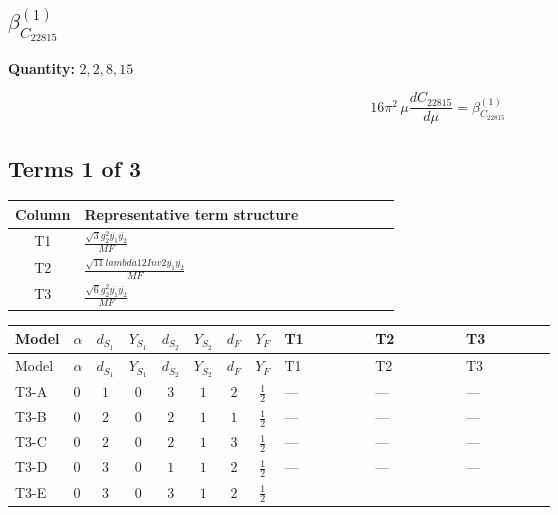 \documentclass[8pt]{article}
\begin{document}
\begin{landscape}
\section*{$\beta_{C_{22815}}^{(1)}$}
\noindent\textbf{Quantity: }$\mathrm{2,2,8,15}$\par\smallskip
\[16\pi^2\,\mu\frac{d C_{22815}}{d\mu}=\beta_{C_{22815}}^{(1)}\]
\subsection*{Terms 1 of 3}
\begin{center}
\begin{tabular}{@{}c >{\raggedright\arraybackslash}p{0.82\linewidth}@{}}
\toprule
Column & Representative term structure \\
\midrule
T1 & \(\displaystyle \frac{\sqrt{3} g_{2}^{2} \overline{y_{1}} \overline{y_{2}}}{MF}\) \\
\midrule
T2 & \(\displaystyle \frac{\sqrt{11} lambda12Inv2 \overline{y_{1}} \overline{y_{2}}}{MF}\) \\
\midrule
T3 & \(\displaystyle \frac{\sqrt{6} g_{2}^{2} \overline{y_{1}} \overline{y_{2}}}{MF}\) \\
\midrule
\bottomrule
\end{tabular}
\end{center}
\smallskip
\tiny
\begin{longtable}{@{}llcccccc >{\raggedright\arraybackslash}p{0.21\linewidth} >{\raggedright\arraybackslash}p{0.21\linewidth} >{\raggedright\arraybackslash}p{0.21\linewidth}@{}}
\toprule
Model & $\alpha$ & $d_{S_1}$ & $Y_{S_1}$ & $d_{S_2}$ & $Y_{S_2}$ & $d_F$ & $Y_F$ & T1 & T2 & T3 \\
\midrule
\endfirsthead
\toprule
Model & $\alpha$ & $d_{S_1}$ & $Y_{S_1}$ & $d_{S_2}$ & $Y_{S_2}$ & $d_F$ & $Y_F$ & T1 & T2 & T3 \\
\midrule
\endhead
T3-A & $0$ & $1$ & $0$ & $3$ & $1$ & $2$ & $\frac{1}{2}$ & --- & --- & --- \\
\midrule
T3-B & $0$ & $2$ & $0$ & $2$ & $1$ & $1$ & $\frac{1}{2}$ & --- & --- & --- \\
\midrule
T3-C & $0$ & $2$ & $0$ & $2$ & $1$ & $3$ & $\frac{1}{2}$ & --- & --- & --- \\
\midrule
T3-D & $0$ & $3$ & $0$ & $1$ & $1$ & $2$ & $\frac{1}{2}$ & --- & --- & --- \\
\midrule
T3-E & $0$ & $3$ & $0$ & $3$ & $1$ & $2$ & $\frac{1}{2}$ & \scriptsize\adjustbox{max width=\linewidth}{$\begin{gathered} - \frac{49 \sqrt{3} g_{2}^{2} \overline{y_{1}} \overline{y_{2}}}{24 MF}\end{gathered}$} & \scriptsize\adjustbox{max width=\linewidth}{$\begin{gathered} - \frac{3 \sqrt{11} lambda12Inv2 \overline{y_{1}} \overline{y_{2}}}{22 MF}\end{gathered}$} & \scriptsize\adjustbox{max width=\linewidth}{$\begin{gathered} - \frac{\sqrt{6} g_{2}^{2} \overline{y_{1}} \overline{y_{2}}}{3 MF}\end{gathered}$} \\

\end{longtable}
\end{landscape}
\end{document}
